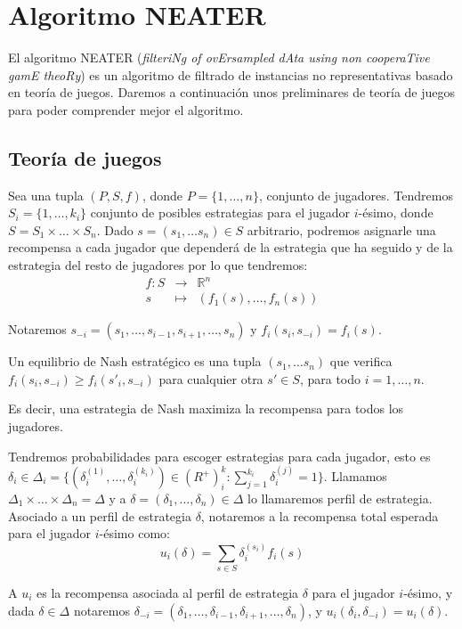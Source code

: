 \section{Algoritmo NEATER}
El algoritmo NEATER (\textit{filteriNg of ovErsampled dAta using non cooperaTive gamE theoRy}) es un algoritmo de filtrado 
de instancias no representativas basado en teoría de juegos. Daremos a continuación unos preliminares de teoría de juegos
para poder comprender mejor el algoritmo.

\subsection{Teoría de juegos}
Sea una tupla $(P, S, f)$, donde $P=\{1, \ldots, n\}$, conjunto de jugadores. Tendremos $S_i=\{1, \ldots, k_i\}$ conjunto
de posibles estrategias para el jugador $i$-ésimo, donde $S = S_1 \times \ldots \times S_n$. Dado $s = (s_1, \ldots s_n) \in S$
arbitrario, podremos asignarle una recompensa a cada jugador que dependerá de la estrategia que ha seguido y de la estrategia del
resto de jugadores por lo que tendremos:
\[
  \begin{array}{rll}
  f: S &\longrightarrow& \mathbb{R}^n\\
  s &\longmapsto& (f_1(s), \ldots, f_n(s))
 \end{array}
\]
  
Notaremos $s_{-i} = (s_1, \ldots, s_{i-1}, s_{i+1}, \ldots, s_n)$ y $f_i(s_i, s_{-i})= f_i(s)$.

\begin{definition}
Un equilibrio de Nash estratégico es una tupla $(s_1, \ldots s_n)$ que verifica $f_i(s_i, s_{-i}) \ge f_i(s'_{i}, s_{-i})$ 
para cualquier otra $s'\in S$, para todo $i=1, \ldots, n$.
\end{definition}

Es decir, una estrategia de Nash maximiza la recompensa para todos los jugadores.

Tendremos probabilidades para escoger estrategias para cada jugador, esto es 
$\delta_i \in \Delta_i = \{(\delta_i^{(1)}, \ldots, \delta_i^{(k_i)}) \in (R^{+})^k_i : \sum_{j=1}^{k_i} \delta_i^{(j)} = 1\}$. 
Llamamos $\Delta_1 \times \ldots \times \Delta_n = \Delta$ y a $\delta = (\delta_1, \ldots, \delta_n) \in \Delta$ lo llamaremos perfil de estrategia. 
Asociado a un perfil de estrategia $\delta$, notaremos a la recompensa total esperada para el jugador $i$-ésimo como:
\[
  u_i(\delta) = \sum_{s\in S} \delta_i^{(s_i)} f_i(s)
\]

A $u_i$ es la recompensa asociada al perfil de estrategia $\delta$ para el jugador $i$-ésimo, y dada $\delta\in \Delta$ notaremos
$\delta_{-i} = (\delta_1, \ldots, \delta_{i-1}, \delta_{i+1}, \ldots, \delta_n)$, y $u_i(\delta_i, \delta_{-i})= u_i(\delta)$.

